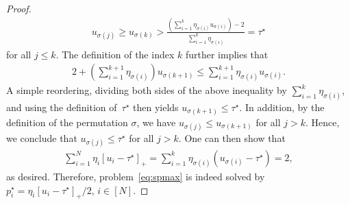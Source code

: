 \documentclass[11pt, a4paper, oneside, reqno]{article}
\begin{document}
\begin{proof}
	\begin{align*}
	    u_{\sigma(j)} \geq u_{\sigma(k)} > \frac{(\sum_{i=1}^k \eta_{\sigma(i)} u_{\sigma(i)}) - 2}{\sum_{i=1}^k \eta_{\sigma(i)}} = \tau^\star
	\end{align*}
	for all $j \le k$. The definition of the index $k$ further implies that
	\begin{align*}
	    2 + \left( \sum_{i=1}^{k+1} \eta_{\sigma(i)} \right) u_{\sigma(k+1)} \leq \sum_{i=1}^{k+1} \eta_{\sigma(i)} u_{\sigma(i)}.
	\end{align*}
	A simple reordering, dividing both sides of the above inequality by $\sum_{i=1}^k \eta_{\sigma(i)}$, and using the definition of~$\tau^\star$ then yields $u_{\sigma(k+1)} \leq \tau^\star$. In addition, by the definition of the permutation $\sigma$, we have $u_{\sigma(j)} \leq u_{\sigma(k+1)}$ for all $j > k$. Hence, we conclude that $u_{\sigma(j)} \leq \tau^\star$ for all $j > k$. One can then show that
	\begin{align*}
	    \sum_{i=1}^N \eta_i [u_i - \tau^\star]_+ = \sum_{i=1}^k \eta_{\sigma(i)} (u_{\sigma(i)} - \tau^\star) = 2,
	\end{align*}
	as desired. Therefore, problem~\eqref{eq:spmax} is indeed solved by $p^\star_{i} = \eta_i [u_i - \tau^\star]_+ / 2$, $i\in[N]$.
	\end{proof}
    
\end{document}
